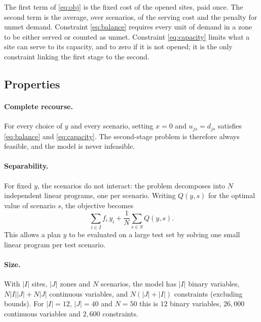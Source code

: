 \documentclass[11pt,a4paper]{article}
\begin{document}
The first term of \eqref{eq:obj} is the fixed cost of the opened sites, paid once.
The second term is the average, over scenarios, of the serving cost and the penalty
for unmet demand. Constraint \eqref{eq:balance} requires every unit of demand in a
zone to be either served or counted as unmet. Constraint \eqref{eq:capacity} limits
what a site can serve to its capacity, and to zero if it is not opened; it is the
only constraint linking the first stage to the second.

\subsection{Properties}

\paragraph{Complete recourse.}
For every choice of $y$ and every scenario, setting $x = 0$ and $u_{js} = d_{js}$
satisfies \eqref{eq:balance} and \eqref{eq:capacity}. The second-stage problem is
therefore always feasible, and the model is never infeasible.

\paragraph{Separability.}
For fixed $y$, the scenarios do not interact: the problem decomposes into $N$
independent linear programs, one per scenario. Writing $Q(y,s)$ for the optimal value of
scenario $s$, the objective becomes
\[
  \sum_{i \in I} f_i\, y_i + \frac{1}{N} \sum_{s \in S} Q(y,s).
\]
This allows a plan $y$ to be evaluated on a large test set by solving one small
linear program per test scenario.

\paragraph{Size.}
With $|I|$ sites, $|J|$ zones and $N$ scenarios, the model has $|I|$ binary variables,
$N|I||J| + N|J|$ continuous variables, and $N(|J| + |I|)$ constraints
(excluding bounds). For $|I|=12$, $|J|=40$ and $N=50$ this is $12$ binary variables,
$26{,}000$ continuous variables and $2{,}600$ constraints.
\end{document}
